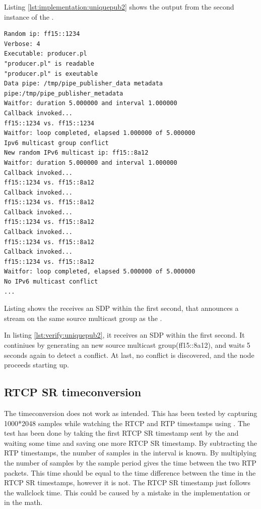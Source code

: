 Listing \ref{lst:implementation:uniquepub2} shows the output from the second instance of the .

\begin{listing}[H] 
\begin{verbatim}
Random ip: ff15::1234
Verbose: 4
Executable: producer.pl
"producer.pl" is readable
"producer.pl" is exeutable
Data pipe: /tmp/pipe_publisher_data metadata pipe:/tmp/pipe_publisher_metadata
Waitfor: duration 5.000000 and interval 1.000000
Callback invoked...
ff15::1234 vs. ff15::1234
Waitfor: loop completed, elapsed 1.000000 of 5.000000
Ipv6 multicast group conflict
New random IPv6 multicast ip: ff15::8a12
Waitfor: duration 5.000000 and interval 1.000000
Callback invoked...
ff15::1234 vs. ff15::8a12
Callback invoked...
ff15::1234 vs. ff15::8a12
Callback invoked...
ff15::1234 vs. ff15::8a12
Callback invoked...
ff15::1234 vs. ff15::8a12
Callback invoked...
ff15::1234 vs. ff15::8a12
Waitfor: loop completed, elapsed 5.000000 of 5.000000
No IPv6 multicast conflict
...
\end{verbatim}
\caption{Listing shows the \pub{} receives an SDP within the first second, that announces a stream on the same source multicast group as the \pub{}. }
\label{lst:verify:uniquepub2}
\end{listing}

In listing \ref{lst:verify:uniquepub2}, it receives an SDP within the first second. It continiues by generating an new source multicast group(ff15::8a12), and waits 5 seconds again to detect a conflict. At last, no conflict is discovered, and the node proceeds starting up.


\subsection{RTCP SR timeconversion}\label{sec:verify:rtcpsr}
The timeconversion does not work as intended. This has been tested by capturing 1000*2048 samples while watching the RTCP and RTP timestamps using .  The test has been done by taking the first RTCP SR timestamp sent by the \pub{} and waiting some time and saving one more RTCP SR timestamp. By subtracting the RTP timestamps, the number of samples in the interval is known. By multiplying the number of samples by the sample period gives the time between the two RTP packets. This time should be equal to the time difference between the time in the RTCP SR timestamps, however it is not. The RTCP SR timestamp just follows the wallclock time. This could be caused by a mistake in the implementation or in the math.\\

